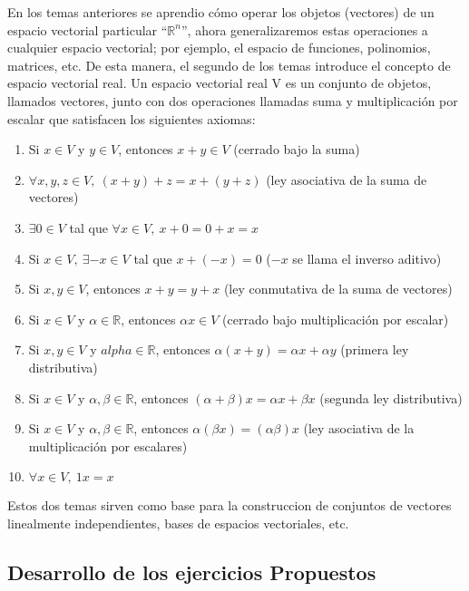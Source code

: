 \documentclass[12pt]{article}
\theoremstyle{plain}
\theoremstyle{definition}
\begin{document}
        En los temas anteriores se aprendio cómo operar los objetos (vectores) de un espacio vectorial particular ``$\mathbb{R}^n$'', ahora generalizaremos estas operaciones a cualquier espacio vectorial; por ejemplo, el espacio de funciones, polinomios, matrices, etc. De esta manera, el segundo de los temas introduce el concepto de espacio vectorial real. Un espacio vectorial real V es un conjunto de objetos, llamados vectores, junto con dos operaciones llamadas suma y multiplicación por escalar que satisfacen los siguientes axiomas:
        \begin{enumerate}
            \item Si $x\in V$ y $y\in V$, entonces $x+y\in V$ (cerrado bajo la suma)
            \item $\forall x,y,z \in V,\ (x+y)+z=x+(y+z)$ (ley asociativa de la suma de vectores)
            \item $\exists 0 \in V$ tal que $\forall x\in V,\ x+0=0+x=x$ 
            \item Si $x\in V, \ \exists -x \in V$ tal que $x+(-x)=0$ ($-x$ se llama el inverso aditivo)
            \item Si $x,y\in V$, entonces $x+y=y+x$ (ley conmutativa de la suma de vectores)
            \item Si $x\in V$ y $\alpha \in \mathbb{R}$, entonces $\alpha x\in V$ (cerrado bajo multiplicación por escalar)
            \item Si $x,y\in V$ y $alpha \in \mathbb{R}$, entonces $\alpha(x+y)=\alpha x+\alpha y$ (primera ley distributiva)
            \item Si $x\in V$ y $\alpha, \beta\in \mathbb{R}$, entonces $(\alpha+\beta)x=\alpha x+\beta x$ (segunda ley distributiva)
            \item Si $x\in V$ y  $\alpha, \beta\in \mathbb{R}$, entonces $\alpha(\beta x)=(\alpha\beta)x$ (ley asociativa de la multiplicación por escalares)
            \item $\forall x\in V,\ 1x=x$ 
        \end{enumerate} 
        
        Estos dos temas sirven como base para la construccion de conjuntos de vectores linealmente independientes, bases de espacios vectoriales, etc. 
        
        
\subsection{Desarrollo de los ejercicios Propuestos}
\end{document}
